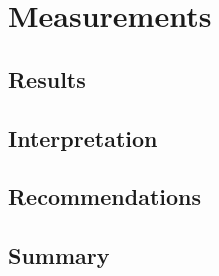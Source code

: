 \chapter{Measurements}

\section{Results}

\section{Interpretation}

\section{Recommendations}

\section{Summary}
